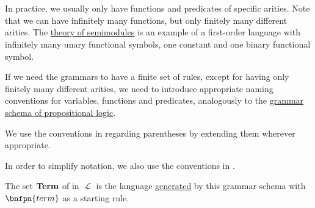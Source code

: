 \begin{definition}
\begin{thmenum}
\begin{bnf*}
       \\
      \bnfmore                  {\hspace{3cm} \vdots} \\
       \\
      \bnfmore                  {\hspace{3cm} \vdots} \\
               { \bnfor} \\
       \\
       \\
    \end{bnf*}

    In practice, we usually only have functions and predicates of specific arities. Note that we can have infinitely many functions, but only finitely many different arities. The \hyperref[def:semimodule/theory]{theory of semimodules} is an example of a first-order language with infinitely many unary functional symbols, one constant and one binary functional symbol.

    If we need the grammars to have a finite set of rules, except for having only finitely many different arities, we need to introduce appropriate naming conventions for variables, functions and predicates, analogously to the \hyperref[def:propositional_syntax/grammar_schema]{grammar schema of propositional logic}.

    We use the conventions in  regarding parentheses by extending them wherever appropriate.

    In order to simplify notation, we also use the conventions in .

     The set \( \operatorname{\mathbf{Term}} \) of  in \( \mscrL \) is the language \hyperref[def:grammar_derivation/grammar_language]{generated} by this grammar schema with \( \bnfpn{term} \) as a starting rule.


\end{thmenum}
\end{definition}
